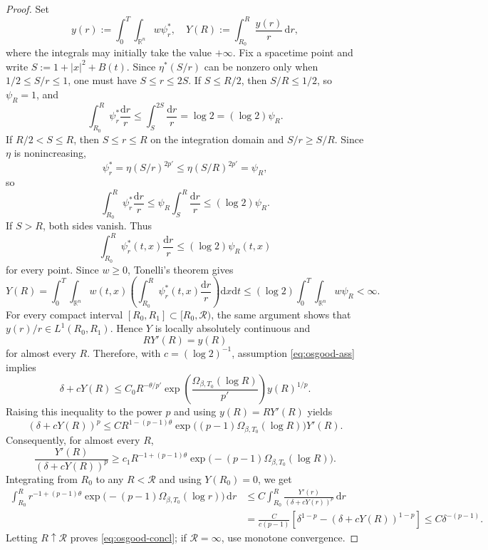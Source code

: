 \documentclass[11pt,reqno]{amsart}
\theoremstyle{definition}
\theoremstyle{remark}
\begin{document}
	\begin{proof}
		Set
		$$
		y(r):=\int_0^T\int_{\mathbb{R}^n}w\psi_r^*,
		\quad
		Y(R):=\int_{R_0}^R\frac{y(r)}{r}\,\mathrm{d}r,
		$$
		where the integrals may initially take the value $+\infty$. Fix a spacetime point and write $S:=1+|x|^2+B(t)$. Since $\eta^*(S/r)$ can be nonzero only when $1/2\leq S/r\leq1$, one must have $S\leq r\leq2S$. If $S\leq R/2$, then $S/R\leq1/2$, so $\psi_R=1$, and
		$$
		\int_{R_0}^R\psi_r^*\frac{\mathrm{d}r}{r}
		\leq\int_S^{2S}\frac{\mathrm{d}r}{r}
		=\log2=(\log2)\psi_R.
		$$
		If $R/2<S\leq R$, then $S\leq r\leq R$ on the integration domain and $S/r\geq S/R$. Since $\eta$ is nonincreasing,
		$$
		\psi_r^*=\eta(S/r)^{2p'}\leq\eta(S/R)^{2p'}=\psi_R,
		$$
		so
		$$
		\int_{R_0}^R\psi_r^*\frac{\mathrm{d}r}{r}
		\leq\psi_R\int_S^R\frac{\mathrm{d}r}{r}
		\leq(\log2)\psi_R.
		$$
		If $S>R$, both sides vanish. Thus
		$$
		\int_{R_0}^R\psi_r^*(t,x)\frac{\mathrm{d}r}{r}
		\leq(\log2)\psi_R(t,x)
		$$
		for every point. Since $w\geq0$, Tonelli's theorem gives
		$$
		Y(R)=\int_0^T\int_{\mathbb{R}^n} w(t,x) \left(\int_{R_0}^R\psi_r^*(t,x)\frac{\mathrm{d}r}{r}\right)
		\mathrm d x\mathrm d t \leq(\log2) \int_0^T\int_{\mathbb{R}^n} w\psi_R<\infty.
		$$
		For every compact interval $[R_0,R_1]\subset[R_0,\mathcal R)$, the same argument shows that $y(r)/r\in L^1(R_0,R_1)$. Hence $Y$ is locally absolutely continuous and
		$$
		RY'(R)=y(R)
		$$
		for almost every $R$. Therefore, with $c=(\log2)^{-1}$, assumption \eqref{eq:osgood-ass} implies
		$$
		\delta+cY(R)
		\leq C_0R^{-\theta/p'}
		\exp\left(\frac{\Omega_{\beta,T_0}(\log R)}{p'}\right)
		y(R)^{1/p}.
		$$
		Raising this inequality to the power $p$ and using $y(R)=RY'(R)$ yields
		$$
		(\delta+cY(R))^p
		\leq C R^{1-(p-1)\theta}
		\exp\bigl((p-1)\Omega_{\beta,T_0}(\log R)\bigr)Y'(R).
		$$
		Consequently, for almost every $R$,
		$$
		\frac{Y'(R)}{(\delta+cY(R))^p}
		\geq c_1R^{-1+(p-1)\theta}
		\exp\bigl(-(p-1)\Omega_{\beta,T_0}(\log R)\bigr).
		$$
		Integrating from $R_0$ to any $R<\mathcal R$ and using $Y(R_0)=0$, we get
		\begin{align*}
			\int_{R_0}^R
			r^{-1+(p-1)\theta}
			\exp\bigl(-(p-1)\Omega_{\beta,T_0}(\log r)\bigr)\,\mathrm{d}r &\leq C\int_{R_0}^R\frac{Y'(r)}{(\delta+cY(r))^p}\,\mathrm{d}r\\
			&=\frac{C}{c(p-1)}
			\left[\delta^{1-p}-(\delta+cY(R))^{1-p}\right]
			\leq C\delta^{-(p-1)}.
		\end{align*}
		Letting $R\uparrow\mathcal R$ proves \eqref{eq:osgood-concl}; if $\mathcal R=\infty$, use monotone convergence.
	\end{proof}
	
\end{document}
